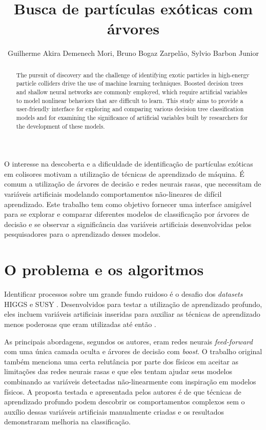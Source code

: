 \documentclass[12pt]{article}
\title{Busca de partículas exóticas com árvores}
\author{Guilherme Akira Demenech Mori\inst{1}, Bruno Bogaz Zarpelão\inst{1}, Sylvio Barbon Junior\inst{2}}
\begin{document}
 
\maketitle

\begin{abstract}
	The pursuit of discovery and the challenge of identifying exotic particles in high-energy particle colliders drive the use of machine learning techniques.
	Boosted decision trees and shallow neural networks are commonly employed, which require artificial variables to model nonlinear behaviors that are difficult to learn.
	This study aims to provide a user-friendly interface for exploring and comparing various decision tree classification models and for examining the significance of artificial variables built by researchers for the development of these models.
\end{abstract}
     
\begin{resumo} 
	O interesse na descoberta e a dificuldade de identificação de partículas exóticas em colisores motivam a utilização de técnicas de aprendizado de máquina.
	É comum a utilização de árvores de decisão e redes neurais rasas, que necessitam de variáveis artificiais modelando comportamentos não-lineares de difícil aprendizado.  
	Este trabalho tem como objetivo fornecer uma interface amigável para se explorar e comparar diferentes modelos de classificação por árvores de decisão e se observar a significância das variáveis artificiais desenvolvidas pelos pesquisadores para o aprendizado desses modelos.
\end{resumo}


\section{O problema e os algoritmos}


Identificar processos sobre um grande fundo ruidoso é o desafio dos \textit{datasets} HIGGS \cite{higgs_280} e SUSY \cite{susy_279}.    
Desenvolvidos para testar a utilização de aprendizado profundo, eles incluem variáveis artificiais inseridas para auxiliar as técnicas de aprendizado menos poderosas que eram utilizadas até então \cite{Baldi_2014}.   
 
As principais abordagens, segundos os autores, eram redes neurais \textit{feed-forward} com uma única camada oculta e árvores de decisão com \textit{boost}. 
O trabalho original também menciona uma certa relutância por parte dos físicos em aceitar as limitações das redes neurais rasas e que eles tentam ajudar seus modelos combinando as variáveis detectadas não-linearmente com inspiração em modelos físicos.
A proposta testada e apresentada pelos autores é de que técnicas de aprendizado profundo podem descobrir os comportamentos complexos sem o auxílio dessas variáveis artificiais manualmente criadas e os resultados demonstraram melhoria na classificação.  
\end{document}
